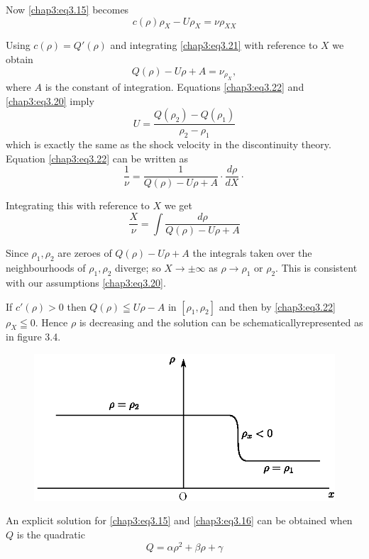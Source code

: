 Now \eqref{chap3:eq3.15} becomes 
\begin{equation}
c(\rho)\rho_X-U\rho_X=\nu\rho_{XX}\tag{3.21}\label{chap3:eq3.21}
\end{equation}

Using $c(\rho)=Q'(\rho)$ and integrating \eqref{chap3:eq3.21} with reference to $X$ we obtain
\begin{equation}
Q(\rho)-U\rho +A=\nu_{\rho_{X}},\tag{3.22}\label{chap3:eq3.22}
\end{equation}
where $A$ is the constant of integration. Equations \eqref{chap3:eq3.22} and \eqref{chap3:eq3.20} imply
$$
U=\frac{Q(\rho_2)-Q(\rho_1)}{\rho_2-\rho_1}
$$
which is exactly the same as the shock velocity in the discontinuity theory. Equation \eqref{chap3:eq3.22} can be written as 
$$
\frac{1}{\nu}=\frac{1}{Q(\rho)-U\rho+A}\cdotp \frac{d\rho}{dX}\cdotp
$$

Integrating this with reference to $X$ we get 
\begin{equation}
\frac{X}{\nu}=\int\frac{d\rho}{Q(\rho)-U\rho+A}\tag{3.23}\label{chap3:eq3.23}
\end{equation}

Since $\rho_1,\rho_2$ are zeroes of $Q(\rho)-U\rho+A$ the integrals taken over the neighbourhoods of $\rho_1,\rho_2$ diverge; so $X\to \pm\infty$ as $\rho\to\rho_1$ or $\rho_2$. This is consistent with our assumptions \eqref{chap3:eq3.20}. 

If $c'(\rho)>0$ then $Q(\rho)\leqq U\rho - A$ in $[\rho_1,\rho_2]$ and then by \eqref{chap3:eq3.22} $\rho_X\leqq 0$. Hence $\rho$ is decreasing and the solution can be schematically\pageoriginale represented as in figure 3.4.
\begin{figure}[H]
\centering
\includegraphics{figures/fig61-3.4.eps}
\caption{}
\label{chap1:fig3.4}
\end{figure}


An explicit solution for \eqref{chap3:eq3.15} and \eqref{chap3:eq3.16} can be obtained when $Q$ is the quadratic 
$$
Q=\alpha\rho^2+\beta\rho +\gamma
$$

